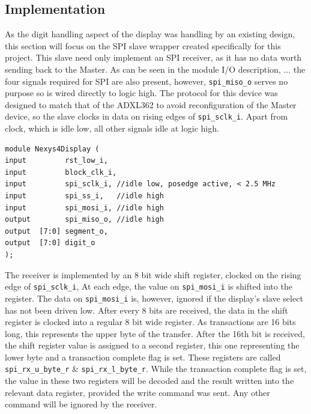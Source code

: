 \documentclass[11pt,british]{report}
\begin{document}
\subsection*{Implementation}
As the digit handling aspect of the display was handling by an existing design, this section will focus on the SPI slave wrapper created specifically for this project. This slave need only implement an SPI receiver, as it has no data worth sending back to the Master. As can be seen in the module I/O description, ... the four signals required for SPI are also present, however, \texttt{spi\_miso\_o} serves no purpose so is wired directly to logic high. The protocol for this device was designed to match that of the ADXL362 to avoid reconfiguration of the Master device, so the slave clocks in data on rising edges of \texttt{spi\_sclk\_i}. Apart from clock, which is idle low, all other signals idle at logic high.
\begin{lstlisting}[style={verilog-style}]
module Nexys4Display (
input         rst_low_i,
input         block_clk_i,
input         spi_sclk_i, //idle low, posedge active, < 2.5 MHz
input         spi_ss_i,   //idle high
input         spi_mosi_i, //idle high
output        spi_miso_o, //idle high
output  [7:0] segment_o, 
output  [7:0] digit_o
);
\end{lstlisting}

The receiver is implemented by an 8 bit wide shift register, clocked on the rising edge of \texttt{spi\_sclk\_i}, At each edge, the value on \texttt{spi\_mosi\_i} is shifted into the register. The data on \texttt{spi\_mosi\_i} is, however, ignored if the display's slave select has not been driven low. After every 8 bits are received, the data in the shift register is clocked into a regular 8 bit wide register. As transactions are 16 bits long, this represents the upper byte of the transfer. After the 16th bit is received, the shift register value is assigned to a second register, this one representing the lower byte and a transaction complete flag is set. These registers are called \texttt{spi\_rx\_u\_byte\_r} \& \texttt{spi\_rx\_l\_byte\_r}. While the transaction complete flag is set, the value in these two registers will be decoded and the result written into the relevant data register, provided the write command was sent. Any other command will be ignored by the receiver.
\end{document}
